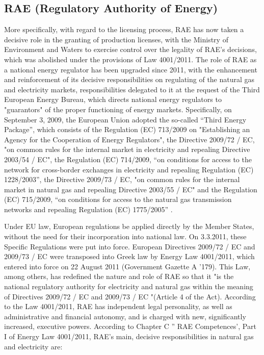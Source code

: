 \subsection{RAE (Regulatory Authority of Energy)}
\par More specifically, with regard to the licensing process, RAE has now taken a decisive role in the granting of production licenses, with the Ministry of Environment and Waters to exercise control over the legality of RAE's decisions, which was abolished under the provisions of Law 4001/2011. The role of RAE as a national energy regulator has been upgraded since 2011, with the enhancement and reinforcement of its decisive responsibilities on regulating of the natural gas and electricity markets, responsibilities delegated to it at the request of the Third European Energy Bureau, which directs national energy regulators to "guarantors" of the proper functioning of energy markets. Specifically, on September 3, 2009, the European Union adopted the so-called “Third Energy Package”, which consists of the Regulation (EC) 713/2009  on "Establishing an Agency for the Cooperation of Energy Regulators", the Directive 2009/72 / EC, "on common rules for the internal market in electricity and repealing Directive 2003/54 / EC", the Regulation (EC) 714/2009, “on conditions for access to the network for cross-border exchanges in electricity and repealing Regulation (EC) 1228/2003”, the Directive 2009/73 / EC, "on common rules for the internal market in natural gas and repealing Directive 2003/55 / EC" and the Regulation (EC) 715/2009, “on conditions for access to the natural gas transmission networks and repealing Regulation (EC) 1775/2005” \cite{rae}.
\par Under EU law, European regulations be applied directly by the Member States, without the need for their incorporation into national law. On 3.3.2011, these Specific Regulations were put into force. European Directives 2009/72 / EC and 2009/73 / EC were transposed into Greek law by Energy Law 4001/2011, which entered into force on 22 August 2011 (Government Gazette A '179). This Law, among others, has redefined the nature and role of RAE so that it "is the national regulatory authority for electricity and natural gas within the meaning of Directives 2009/72 / EC and 2009/73 / EC "(Article 4 of the Act). According to the Law 4001/2011, RAE has independent legal personality, as well as administrative and financial autonomy, and is charged with new, significantly increased, executive powers. According to Chapter C '' RAE Competences', Part I of Energy Law 4001/2011, RAE's main, decisive responsibilities in natural gas and electricity are:
